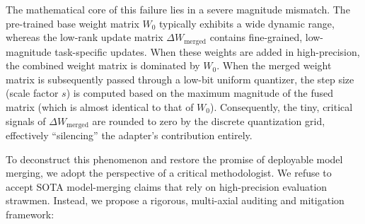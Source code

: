 The mathematical core of this failure lies in a severe magnitude mismatch. The pre-trained base weight matrix $W_0$ typically exhibits a wide dynamic range, whereas the low-rank update matrix $\Delta W_{\text{merged}}$ contains fine-grained, low-magnitude task-specific updates. When these weights are added in high-precision, the combined weight matrix is dominated by $W_0$. When the merged weight matrix is subsequently passed through a low-bit uniform quantizer, the step size (scale factor $s$) is computed based on the maximum magnitude of the fused matrix (which is almost identical to that of $W_0$). Consequently, the tiny, critical signals of $\Delta W_{\text{merged}}$ are rounded to zero by the discrete quantization grid, effectively ``silencing'' the adapter's contribution entirely. 

To deconstruct this phenomenon and restore the promise of deployable model merging, we adopt the perspective of a critical methodologist. We refuse to accept SOTA model-merging claims that rely on high-precision evaluation strawmen. Instead, we propose a rigorous, multi-axial auditing and mitigation framework:

